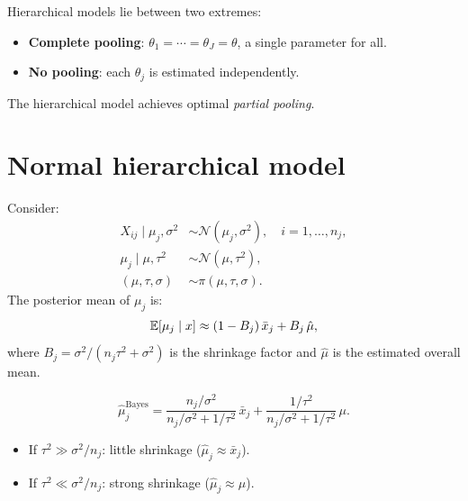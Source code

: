 \begin{remark}
Hierarchical models lie between two extremes:
\begin{itemize}
  \item \textbf{Complete pooling}: $\theta_1 = \cdots = \theta_J = \theta$,
        a single parameter for all.
  \item \textbf{No pooling}: each $\theta_j$ is estimated independently.
\end{itemize}
The hierarchical model achieves optimal \textit{partial pooling}.
\end{remark}

\section{Normal hierarchical model}

\begin{theorem}
\label{thm:hierarch_normal}
Consider:
\begin{align*}
  X_{ij} \mid \mu_j, \sigma^2 &\sim \mathcal{N}(\mu_j, \sigma^2),
  \quad i = 1, \ldots, n_j, \\
  \mu_j \mid \mu, \tau^2 &\sim \mathcal{N}(\mu, \tau^2), \\
  (\mu, \tau, \sigma) &\sim \pi(\mu, \tau, \sigma).
\end{align*}
The posterior mean of $\mu_j$ is:
\[
  \mathbb{E}[\mu_j \mid x] \approx (1 - B_j)\,\bar{x}_j + B_j\,\hat{\mu},
\]
where $B_j = \sigma^2/(n_j\tau^2 + \sigma^2)$ is the shrinkage factor
and $\hat{\mu}$ is the estimated overall mean.
\end{theorem}

\begin{keyformulas}[title=\textbf{Hierarchical shrinkage}]
\[
  \hat{\mu}_j^{\text{Bayes}} = \frac{n_j/\sigma^2}{n_j/\sigma^2 + 1/\tau^2}\,\bar{x}_j
  + \frac{1/\tau^2}{n_j/\sigma^2 + 1/\tau^2}\,\mu.
\]
\begin{itemize}
  \item If $\tau^2 \gg \sigma^2/n_j$: little shrinkage
        ($\hat{\mu}_j \approx \bar{x}_j$).
  \item If $\tau^2 \ll \sigma^2/n_j$: strong shrinkage
        ($\hat{\mu}_j \approx \mu$).
\end{itemize}
\end{keyformulas}

